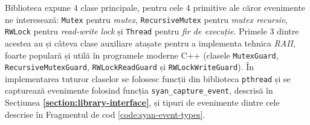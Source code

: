 Biblioteca expune 4 clase principale, pentru cele 4 primitive ale căror
evenimente ne interesează: \lstinline{Mutex} pentru \textit{mutex},
\lstinline{RecursiveMutex} pentru \textit{mutex recursiv},
\lstinline{RWLock} pentru \textit{read-write lock} și \lstinline{Thread}
pentru \textit{fir de execuție}. Primele 3 dintre acestea au și
câteva clase auxiliare atașate pentru a implementa tehnica
\textit{RAII}\cite{RAII}, foarte populară și utilă în programele moderne
C++ (clasele \lstinline{MutexGuard},
\lstinline{RecursiveMutexGuard}, \lstinline{RWLockReadGuard} și
\lstinline{RWLockWriteGuard}). În implementarea tuturor claselor se
folosesc funcții din biblioteca \lstinline{pthread} și se capturează
evenimente folosind funcția \lstinline{syan_capture_event}, descrisă în
Secțiunea \textbf{\ref{section:library-interface}}, și tipuri de
evenimente dintre cele descrise în Fragmentul de cod
\ref{code:syan-event-types}.

